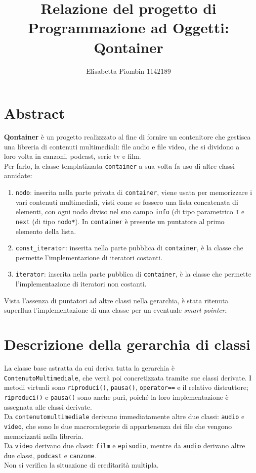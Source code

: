 \documentclass[a4paper,10pt]{article}
\begin{document}
\title {Relazione del progetto di Programmazione ad Oggetti: Qontainer}
\author {Elisabetta Piombin 1142189}
\date{}

\maketitle

\tableofcontents

\section{Abstract}
\textbf{Qontainer} è un progetto realizzzato al fine di fornire un contenitore che gestisca una libreria di contenuti multimediali: file audio e file video, che si dividono a loro volta in canzoni, podcast, serie tv e film. \\
Per farlo, la classe templatizzata \texttt{container} a sua volta fa uso di altre classi annidate:
\begin{enumerate}
\item \texttt{nodo}: inserita nella parte privata di \texttt{container}, viene usata per memorizzare i vari contenuti multimediali, visti come se fossero una lista concatenata di elementi, con ogni nodo diviso nel suo campo \texttt{info} (di tipo parametrico \texttt{T} e \texttt{next} (di tipo \texttt{nodo*}). In \texttt{container} è presente un puntatore al primo elemento della lista.
\item \texttt{const\_iterator}: inserita nella parte pubblica di \texttt{container}, è la classe che permette l'implementazione di iteratori costanti.
\item \texttt{iterator}: inserita nella parte pubblica di \texttt{container}, è la classe che permette l'implementazione di iteratori non costanti.
\end{enumerate}
Vista l'assenza di puntatori ad altre classi nella gerarchia, è stata ritenuta superflua l'implementazione di una classe per un eventuale \textit{smart pointer}.

\section{Descrizione della gerarchia di classi}
La classe base astratta da cui deriva tutta la gerarchia è \texttt{ContenutoMultimediale}, che verrà poi concretizzata tramite sue classi derivate. I metodi virtuali sono \texttt{riproduci()}, \texttt{pausa()}, \texttt{operator==} e il relativo distruttore; \texttt{riproduci()} e \texttt{pausa()} sono anche puri, poiché la loro implementazione è assegnata alle classi derivate. \\
Da \texttt{contenutomultimediale} derivano immediatamente altre due classi: \texttt{audio} e \texttt{video}, che sono le due macrocategorie di appartenenza dei file che vengono memorizzati nella libreria. \\
Da \texttt{video} derivano due classi: \texttt{film} e \texttt{episodio}, mentre da \texttt{audio} derivano altre due classi, \texttt{podcast} e \texttt{canzone}. \\
Non si verifica la situazione di ereditarità multipla. 
\end{document}
